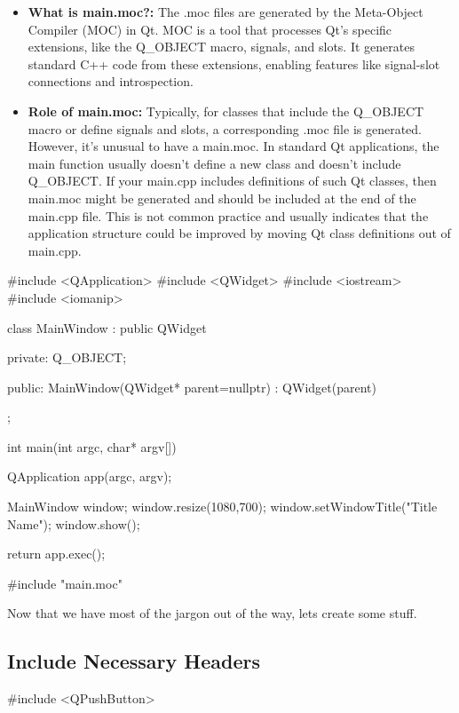\documentclass{report}
\begin{document}
    \pagebreak
    \bigbreak \noindent 
    \begin{itemize}
        \item \textbf{What is main.moc?:} The .moc files are generated by the Meta-Object Compiler (MOC) in Qt. MOC is a tool that processes Qt's specific extensions, like the Q\_OBJECT macro, signals, and slots. It generates standard C++ code from these extensions, enabling features like signal-slot connections and introspection.
        \item \textbf{Role of main.moc:} Typically, for classes that include the Q\_OBJECT macro or define signals and slots, a corresponding .moc file is generated. However, it's unusual to have a main.moc. In standard Qt applications, the main function usually doesn't define a new class and doesn't include Q\_OBJECT. If your main.cpp includes definitions of such Qt classes, then main.moc might be generated and should be included at the end of the main.cpp file. This is not common practice and usually indicates that the application structure could be improved by moving Qt class definitions out of main.cpp.
    \end{itemize}

    \bigbreak \noindent 
    \bigbreak \noindent 
    \begin{cppcode}
#include <QApplication>
#include <QWidget>
#include <iostream>
#include <iomanip>

class MainWindow : public QWidget {
private:
    Q_OBJECT;

public:
    MainWindow(QWidget* parent=nullptr) : QWidget(parent) {

    }

};

int main(int argc, char* argv[]) {
    QApplication app(argc, argv);

    MainWindow window;
    window.resize(1080,700);
    window.setWindowTitle("Title Name");
    window.show();

    return app.exec();
}
#include "main.moc"
    \end{cppcode}

    \pagebreak
    \bigbreak \noindent 
    Now that we have most of the jargon out of the way, lets create some stuff.
    \bigbreak \noindent 
    \subsection{Include Necessary Headers}
    \bigbreak \noindent 
    \begin{cppcode}
    #include <QPushButton>
    \end{cppcode}
    \bigbreak \noindent 
\end{document}
